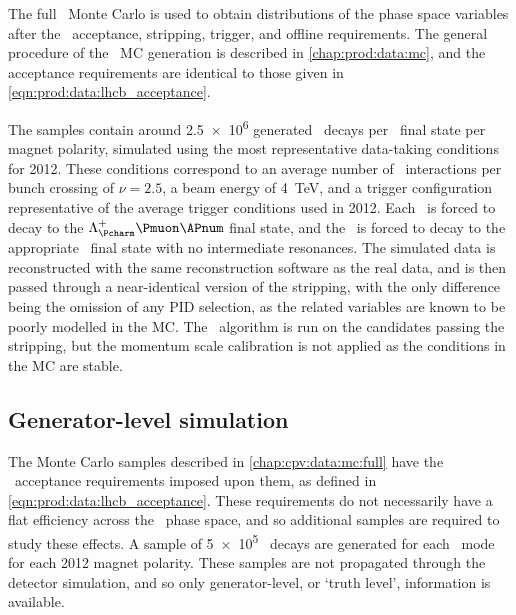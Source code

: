 The full \lhcb\ Monte Carlo is used to obtain distributions of the phase space 
variables after the \lhcb\ acceptance, stripping, trigger, and offline 
requirements.
The general procedure of the \lhcb\ \ac{MC} generation is described in 
\cref{chap:prod:data:mc}, and the acceptance requirements are identical to 
those given in \cref{eqn:prod:data:lhcb_acceptance}.

The samples contain around \num{2.5e6} generated \PLambdab\ decays per 
\PLambdac\ final state per magnet polarity, simulated using the most 
representative data-taking conditions for 2012.
These conditions correspond to an average number of \pp\ interactions per bunch 
crossing of $\nu = 2.5$, a beam energy of \SI{4}{\TeV}, and a trigger 
configuration representative of the average trigger conditions used in 2012.
Each \PLambdab\ is forced to decay to the $\PLambdac\Pmuon\APnum$ final state, 
and the \PLambdac\ is forced to decay to the appropriate \phh\ final state with 
no intermediate resonances.
The simulated data is reconstructed with the same reconstruction software as 
the real data, and is then passed through a near-identical version of the 
stripping, with the only difference being the omission of any \ac{PID} 
selection, as the related variables are known to be poorly modelled in the 
\ac{MC}.
The \decaytreefitter\ algorithm is run on the candidates passing the stripping, 
but the momentum scale calibration is not applied as the conditions in the 
\ac{MC} are stable.

\subsection{Generator-level simulation}
\label{chap:cpv:data:mc:gen}

The Monte Carlo samples described in \cref{chap:cpv:data:mc:full} have the 
\lhcb\ acceptance requirements imposed upon them, as defined in 
\cref{eqn:prod:data:lhcb_acceptance}.
These requirements do not necessarily have a flat efficiency across the 
\LcTophh\ phase space, and so additional samples are required to study these 
effects.
A sample of \num{5e5} \LbToLcmunu\ decays are generated for each \LcTophh\ mode 
for each 2012 magnet polarity.
These samples are not propagated through the detector simulation, and so only 
generator-level, or `truth level', information is available.

\begin{table}
  \centering
  \caption{%
    Integrated luminosity for each data sample used in the analysis.
  }
  \label{tab:cpv:data:luminosity}
  
\end{table}
